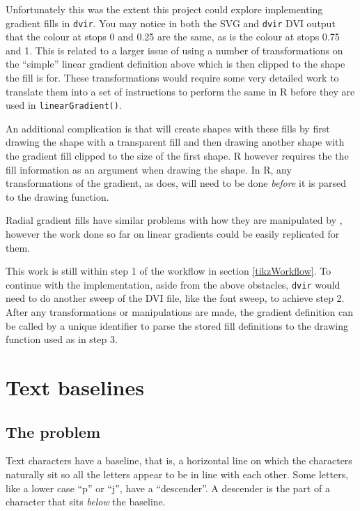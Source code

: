 \documentclass[]{article}
\begin{document}
Unfortunately this was the extent this project could explore
implementing \Tikz{} gradient fills in \texttt{dvir}. You may notice in
both the SVG and \texttt{dvir} DVI output that the colour at stops 0 and
0.25 are the same, as is the colour at stops 0.75 and 1. This is related
to a larger issue of \Tikz{} using a number of transformations on the
``simple'' linear gradient definition above which is then clipped to the
shape the fill is for. These transformations would require some very
detailed work to translate them into a set of instructions to perform
the same in R before they are used in \texttt{linearGradient()}.

An additional complication is that \Tikz{} will create shapes with these
fills by first drawing the shape with a transparent fill and then
drawing another shape with the gradient fill clipped to the size of the
first shape. R however requires the the fill information as an argument
when drawing the shape. In R, any transformations of the gradient, as
\Tikz{} does, will need to be done \emph{before} it is parsed to the
drawing function.

Radial gradient fills have similar problems with how they are
manipulated by \Tikz{}, however the work done so far on linear gradients
could be easily replicated for them.

This work is still within step 1 of the workflow in section
\ref{tikzWorkflow}. To continue with the implementation, aside from the
above obstacles, \texttt{dvir} would need to do another sweep of the DVI
file, like the font sweep, to achieve step 2. After any transformations
or manipulations are made, the gradient definition can be called by a
unique identifier to parse the stored fill definitions to the drawing
function used as in step 3.

\newpage{}

\section{Text baselines}\label{text-baselines}

\subsection{The problem}\label{the-problem}

Text characters have a baseline, that is, a horizontal line on which the
characters naturally sit so all the letters appear to be in line with
each other. Some letters, like a lower case ``p'' or ``j'', have a
``descender''. A descender is the part of a character that sits
\emph{below} the baseline.
\end{document}
